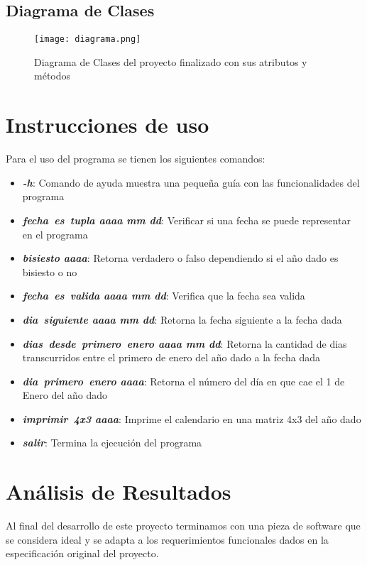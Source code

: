 \documentclass[10pt,journal,compsoc]{IEEEtran}
\begin{document}
\subsection{Diagrama de Clases}
	\begin{figure}[h!]
		\centering
		\texttt{[image: diagrama.png]}
		\caption{Diagrama de Clases del proyecto finalizado con sus atributos y métodos}
	\end{figure}
\section{Instrucciones de uso}
\par Para el uso del programa se tienen los siguientes comandos:
\begin{itemize}
	\item \textbf{\textit{-h}}: Comando de ayuda muestra una pequeña guía con las funcionalidades del programa
	\item \textbf{\textit{fecha\textunderscore~es\textunderscore~tupla aaaa mm dd}}: Verificar si una fecha se puede representar en el programa
	\item \textbf{\textit{bisiesto aaaa}}: Retorna verdadero o falso dependiendo si el año dado es bisiesto o no
	\item \textbf{\textit{fecha\textunderscore~es\textunderscore~valida aaaa mm dd}}: Verifica que la fecha sea valida
	\item \textbf{\textit{dia\textunderscore~siguiente aaaa mm dd}}: Retorna la fecha siguiente a la fecha dada
	\item \textbf{\textit{dias\textunderscore~desde\textunderscore~primero\textunderscore~enero aaaa mm dd}}: Retorna la cantidad de dias transcurridos entre el primero de enero del año dado a la fecha dada
	\item \textbf{\textit{dia\textunderscore~primero\textunderscore~enero aaaa}}: Retorna el número del día en que cae el 1 de Enero del año dado
	\item \textbf{\textit{imprimir\textunderscore~4x3 aaaa}}: Imprime el calendario en una matriz 4x3 del año dado
	\item \textbf{\textit{salir}}: Termina la ejecución del programa
\end{itemize}
\section{Análisis de Resultados}
\par Al final del desarrollo de este proyecto terminamos con una pieza de software que se considera ideal y se adapta a los requerimientos funcionales dados en la especificación original del proyecto. 
	
	
	
	
	
	
	
	
	
	
	
	
	
	
	
	
	
	
	
	
	
\end{document}
